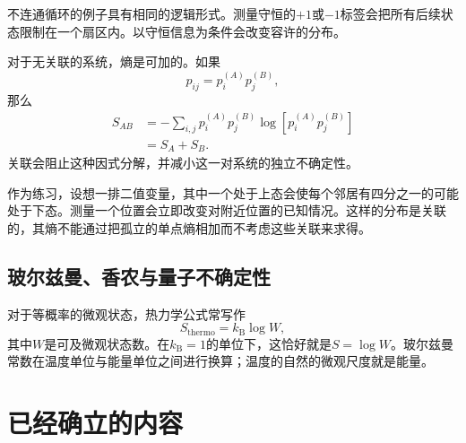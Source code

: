 不连通循环的例子具有相同的逻辑形式。测量守恒的\(+1\)或\(-1\)标签会把所有后续状态限制在一个扇区内。以守恒信息为条件会改变容许的分布。

对于无关联的系统，熵是可加的。如果
\begin{equation}
 p_{ij}=p_i^{(A)}p_j^{(B)},
\end{equation}
那么
\begin{align}
 S_{AB}
 &=-\sum_{i,j}p_i^{(A)}p_j^{(B)}
 \log\!\left[p_i^{(A)}p_j^{(B)}\right]\\
 &=S_A+S_B.
 \label{eq:sm1-entropy-additivity}
\end{align}
关联会阻止这种因式分解，并减小这一对系统的独立不确定性。

作为练习，设想一排二值变量，其中一个处于上态会使每个邻居有四分之一的可能处于下态。测量一个位置会立即改变对附近位置的已知情况。这样的分布是关联的，其熵不能通过把孤立的单点熵相加而不考虑这些关联来求得。

\subsection{玻尔兹曼、香农与量子不确定性}

\begin{classroomqa}
\end{classroomqa}

对于等概率的微观状态，热力学公式常写作
\begin{equation}
 S_{\mathrm{thermo}}=k_{\mathrm B}\log W,
 \label{eq:sm1-boltzmann-formula}
\end{equation}
其中\(W\)是可及微观状态数。在\(k_{\mathrm B}=1\)的单位下，这恰好就是\(S=\log W\)。玻尔兹曼常数在温度单位与能量单位之间进行换算；温度的自然的微观尺度就是能量。

\begin{classroomqa}
\end{classroomqa}

\section{已经确立的内容}

